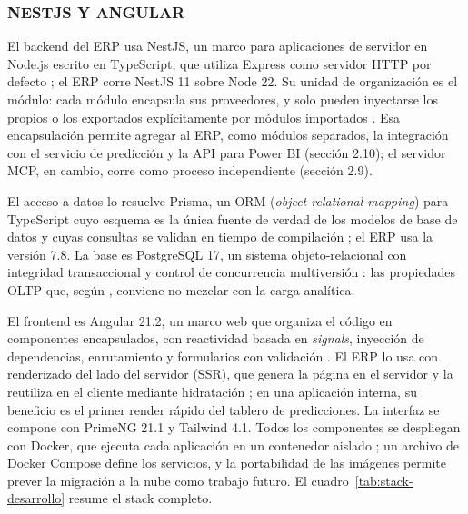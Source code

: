 \subsubsection{NESTJS Y ANGULAR}

El backend del ERP usa NestJS, un marco para aplicaciones de servidor en Node.js escrito en TypeScript, que utiliza Express como servidor HTTP por defecto \parencite{NestJSDocs}; el ERP corre NestJS 11 sobre Node 22. Su unidad de organización es el módulo: cada módulo encapsula sus proveedores, y solo pueden inyectarse los propios o los exportados explícitamente por módulos importados \parencite{NestJSModules}. Esa encapsulación permite agregar al ERP, como módulos separados, la integración con el servicio de predicción y la API para Power BI (sección 2.10); el servidor MCP, en cambio, corre como proceso independiente (sección 2.9).

El acceso a datos lo resuelve Prisma, un ORM (\textit{object-relational mapping}) para TypeScript cuyo esquema es la única fuente de verdad de los modelos de base de datos y cuyas consultas se validan en tiempo de compilación \parencite{PrismaDocs7}; el ERP usa la versión 7.8. La base es PostgreSQL 17, un sistema objeto-relacional con integridad transaccional y control de concurrencia multiversión \parencite{PostgreSQLDocs}: las propiedades OLTP que, según \textcite{Stonebraker2005}, conviene no mezclar con la carga analítica.

El frontend es Angular 21.2, un marco web que organiza el código en componentes encapsulados, con reactividad basada en \textit{signals}, inyección de dependencias, enrutamiento y formularios con validación \parencite{AngularOverview}. El ERP lo usa con renderizado del lado del servidor (SSR), que genera la página en el servidor y la reutiliza en el cliente mediante hidratación \parencite{AngularSSR}; en una aplicación interna, su beneficio es el primer render rápido del tablero de predicciones. La interfaz se compone con PrimeNG 21.1 y Tailwind 4.1. Todos los componentes se despliegan con Docker, que ejecuta cada aplicación en un contenedor aislado \parencite{DockerDocs}; un archivo de Docker Compose define los servicios, y la portabilidad de las imágenes permite prever la migración a la nube como trabajo futuro. El cuadro~\ref{tab:stack-desarrollo} resume el stack completo.

